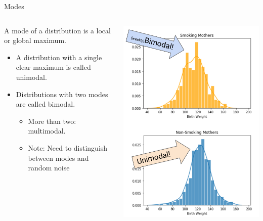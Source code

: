 \documentclass[aspectratio=169]{../latex_main/tntbeamer}  %
\begin{document}
	\begin{frame}{Modes}
        \begin{columns}
            \begin{column}{.5\textwidth}
            A mode of a distribution is a local or global maximum.
                    \begin{itemize}
                        \item A distribution with a single clear maximum is called unimodal.
                        \item Distributions with two modes are called bimodal.
                        \begin{itemize}
                            \item More than two: multimodal.
                            \item \alert{Note}: Need to distinguish between modes and random noise
                        \end{itemize}
                    \end{itemize}
            \end{column}
            
            
            \begin{column}{.4\textwidth}

                       \centering
                       \includegraphics[scale=.3]{Bild34}

            \end{column}
        \end{columns}
    \end{frame}
    
\end{document}
